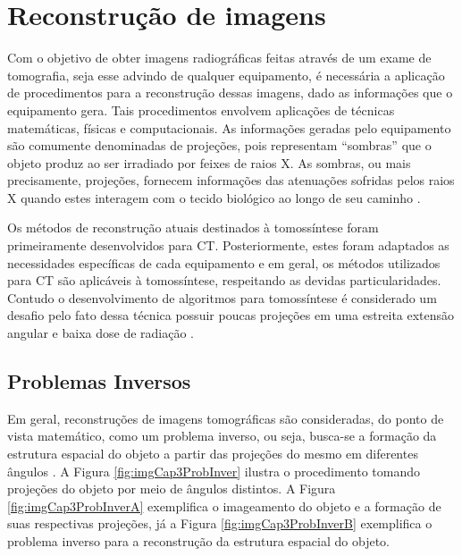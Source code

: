 \chapter[Reconstrução]{Reconstrução de imagens}\label{Capitulo3}


Com o objetivo de obter imagens radiográficas feitas através de um exame de tomografia, seja esse advindo de qualquer equipamento, é necessária a aplicação de procedimentos para a reconstrução dessas imagens, dado as informações que o equipamento gera. Tais procedimentos envolvem aplicações de técnicas matemáticas, físicas e computacionais. As informações geradas pelo equipamento são comumente denominadas de projeções, pois representam ``sombras'' que o objeto produz ao ser irradiado por feixes de raios X. As sombras, ou mais precisamente, projeções, fornecem informações das atenuações sofridas pelos raios X quando estes interagem com o tecido biológico ao longo de seu caminho \cite{buzug2008computed,avinash1988principles}.
 
Os métodos de reconstrução atuais destinados à tomossíntese foram primeiramente desenvolvidos para \acs{CT}. Posteriormente, estes foram adaptados as necessidades específicas de cada equipamento e em geral, os métodos utilizados para \acs{CT} são aplicáveis à tomossíntese, respeitando as devidas particularidades. Contudo o desenvolvimento de algoritmos para tomossíntese é considerado um desafio pelo fato dessa técnica possuir poucas projeções em uma estreita extensão angular e baixa dose de radiação \cite{levakhina2014three,yang2012numerical}.   

\section{Problemas Inversos}

Em geral, reconstruções de imagens tomográficas são consideradas, do ponto de vista matemático, como um problema inverso, ou seja, busca-se a formação da estrutura espacial do objeto a partir das projeções do mesmo em diferentes ângulos \cite{buzug2008computed}. A Figura \ref{fig:imgCap3ProbInver} ilustra o procedimento tomando projeções do objeto por meio de ângulos distintos. A Figura \ref{fig:imgCap3ProbInverA} exemplifica o imageamento do objeto e a formação de suas respectivas projeções, já a Figura \ref{fig:imgCap3ProbInverB} exemplifica o problema inverso para a reconstrução da estrutura espacial do objeto. 

